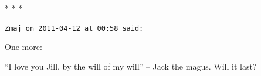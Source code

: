 
\begin{center}* * *\end{center}

\begin{footnotesize}
\begin{sffamily}
\texttt{Zmaj on 2011-04-12 at 00:58 said:}

One more:

``I love you Jill, by the will of my will'' -- Jack the magus. Will it last?

\end{sffamily}
\end{footnotesize}

